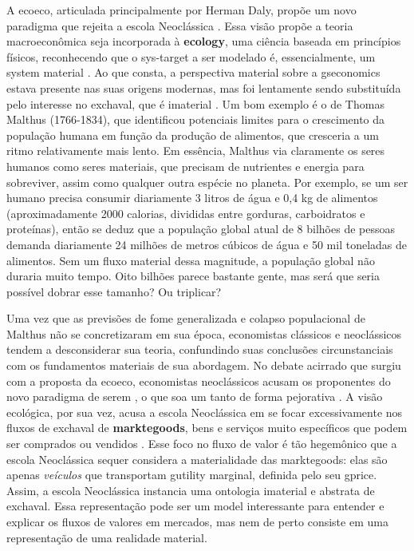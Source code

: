 \documentclass[./main.tex]{subfiles}
\begin{document}
\par A \gls{ecoeco}, articulada principalmente por Herman Daly, propõe um novo \gls{paradigma} que rejeita a escola Neoclássica \cite{daly2011}. Essa visão propõe a \gls{teoria} macroeconômica seja incorporada à \textbf{\gls{ecology}}, uma ciência baseada em princípios físicos, reconhecendo que o \gls{sys-target} a ser modelado é, essencialmente, um \gls{system} material \cite{Daly1968a}. Ao que consta, a perspectiva material sobre a \gls{gseconomics} estava presente nas suas origens modernas, mas foi lentamente sendo substituída pelo interesse no \gls{exchaval}, que é imaterial \cite{Christensen1987}. Um bom exemplo é o de Thomas Malthus (1766-1834), que identificou potenciais limites para o crescimento da população humana em função da produção de alimentos, que cresceria a um ritmo relativamente mais lento. Em essência, Malthus via claramente os seres humanos como seres materiais, que precisam de nutrientes e energia para sobreviver, assim como qualquer outra espécie no planeta. Por exemplo, se um ser humano precisa consumir diariamente 3 litros de água e 0,4 kg de alimentos (aproximadamente 2000 calorias, divididas entre gorduras, carboidratos e proteínas), então se deduz que a população global atual de 8 bilhões de pessoas demanda diariamente 24 milhões de metros cúbicos de água e 50 mil toneladas de alimentos. Sem um fluxo material dessa magnitude, a população global não duraria muito tempo. Oito bilhões parece bastante gente, mas será que seria possível dobrar esse tamanho? Ou triplicar?

\par Uma vez que as previsões de fome generalizada e colapso populacional de Malthus não se concretizaram em sua época, economistas clássicos e neoclássicos tendem a desconsiderar sua \gls{teoria}, confundindo suas conclusões circunstanciais com os fundamentos materiais de sua abordagem. No debate acirrado que surgiu com a proposta da \gls{ecoeco}, economistas neoclássicos acusam os proponentes do novo \gls{paradigma} de serem , o que soa um tanto de forma pejorativa \cite{Forrester1974}. A visão ecológica, por sua vez, acusa a escola Neoclássica em se focar excessivamente nos fluxos de \gls{exchaval} de \textbf{\gls{marktegoods}}, bens e serviços muito específicos que podem ser comprados ou vendidos \cite{Daly1997a, Daly1997b}. Esse foco no fluxo de valor é tão hegemônico que a escola Neoclássica sequer considera a materialidade das \gls{marktegoods}: elas são apenas \textit{veículos} que transportam \gls{gutility} marginal, definida pelo seu \gls{gprice}. Assim, a escola Neoclássica instancia uma ontologia imaterial e abstrata de \gls{exchaval}. Essa representação pode ser um \gls{model} interessante para entender e explicar os fluxos de valores em mercados, mas nem de perto consiste em uma representação de uma realidade material.
\end{document}
